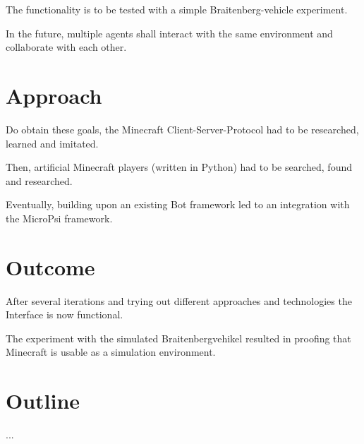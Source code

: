 The functionality is to be tested with a simple Braitenberg-vehicle experiment.

In the future, multiple agents shall interact with the same environment and collaborate with each other.

\section{Approach}
Do obtain these goals, the Minecraft Client-Server-Protocol had to be researched, learned and imitated.

Then, artificial Minecraft players (written in Python) had to be searched, found and researched.

Eventually, building upon an existing Bot framework led to an integration with the MicroPsi framework.

\section{Outcome}
After several iterations and trying out different approaches and technologies the Interface is now functional.

The experiment with the simulated Braitenbergvehikel resulted in proofing that Minecraft is usable as a simulation environment.

\section{Outline}
...
